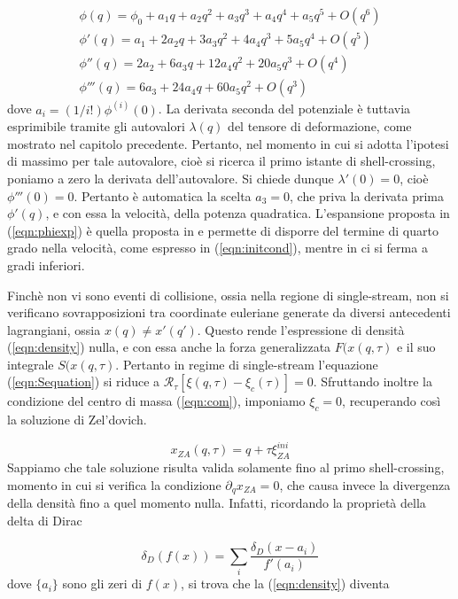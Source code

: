 \begin{gather}
    \label{eqn:phiexp}
    \phi(q) = \phi_0 + a_1 q + a_2 q^2 + a_3 q^3 + a_4 q^4 + a_5 q^5 + O(q^6) \\
    \phi'(q) = a_1 + 2 a_2 q + 3 a_3 q^2 + 4a_4q^3 + 5a_5 q^4 + O(q^5) \\
    \phi''(q) = 2a_2 +6a_3 q + 12a_4 q^2 + 20a_5 q^3 + O(q^4) \\
    \phi'''(q) = 6a_3 + 24 a_4 q + 60a_5 q^2 + O(q^3) 
\end{gather}
dove $a_i = (1/i!) \phi^{(i)}(0)$.
La derivata seconda del potenziale è tuttavia esprimibile tramite gli autovalori $\lambda(q)$ del tensore di deformazione,
come mostrato nel capitolo precedente. Pertanto, nel momento in cui si adotta l'ipotesi di massimo per tale autovalore, cioè
si ricerca il primo istante di shell-crossing, poniamo a zero la derivata dell'autovalore. Si chiede dunque $\lambda'(0)=0$, 
cioè $\phi'''(0)=0$. Pertanto è automatica la
scelta $a_3 = 0$, che priva la derivata prima $\phi'(q)$, e con essa la velocità, della potenza quadratica.
L'espansione proposta in (\ref{eqn:phiexp}) è quella proposta in \cite{rampf} e permette di disporre del termine di quarto grado 
nella velocità, come espresso in (\ref{eqn:initcond}), mentre in \cite{colombi} ci si ferma a gradi inferiori.

Finchè non vi sono eventi di collisione, ossia nella regione di single-stream, non si verificano 
sovrapposizioni tra coordinate euleriane generate da diversi antecedenti lagrangiani, ossia $x(q)\neq x'(q')$.
Questo rende l'espressione di densità (\ref{eqn:density}) nulla, e con essa anche la forza generalizzata
$F(x(q, \tau)$ e il suo integrale $S(x(q, \tau)$. Pertanto  in regime di single-stream l'equazione (\ref{eqn:Sequation}) si riduce
a $\mathcal{R}_{\tau}[\xi(q, \tau)-\xi_c(\tau)] = 0$. Sfruttando inoltre la condizione del centro di 
massa (\ref{eqn:com}), imponiamo $\xi_c = 0$, recuperando così la soluzione di Zel'dovich.

\begin{equation}
    x_{ZA}(q, \tau) = q+ \tau \xi_{ZA}^{ini}
\end{equation}
Sappiamo che tale soluzione risulta valida solamente fino al primo shell-crossing, momento in cui si verifica
la condizione $\partial_q x_{ZA} = 0$, che causa invece la divergenza della densità fino a quel momento nulla.
Infatti, ricordando la proprietà della delta di Dirac

\begin{equation}
    \label{eqn:dirac}
    \delta_D(f(x)) = \sum_i \frac{\delta_D(x-a_i)}{f'(a_i)}
\end{equation}
dove $\{a_i\}$ sono gli zeri di $f(x)$, si trova che la (\ref{eqn:density}) diventa

